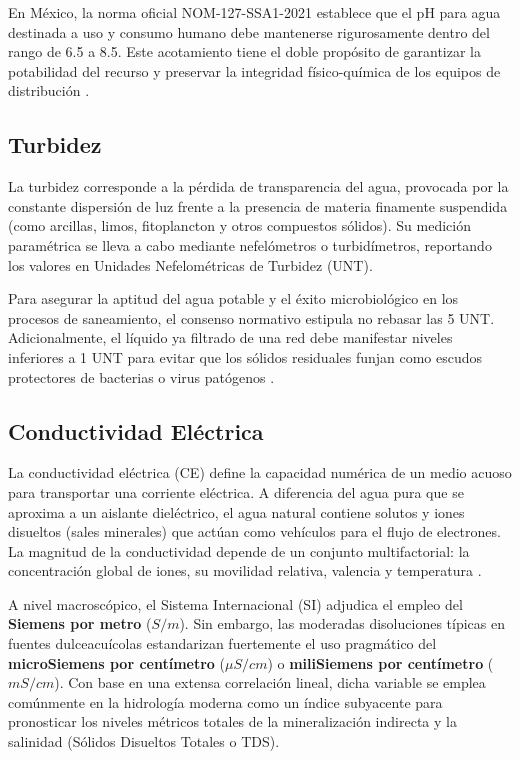 En México, la norma oficial NOM-127-SSA1-2021 establece que el pH para agua destinada a uso y consumo humano debe mantenerse rigurosamente dentro del rango de 6.5 a 8.5. Este acotamiento tiene el doble propósito de garantizar la potabilidad del recurso y preservar la integridad físico-química de los equipos de distribución \cite{uno2020}.

\subsection{Turbidez}
La turbidez corresponde a la pérdida de transparencia del agua, provocada por la constante dispersión de luz frente a la presencia de materia finamente suspendida (como arcillas, limos, fitoplancton y otros compuestos sólidos). Su medición paramétrica se lleva a cabo mediante nefelómetros o turbidímetros, reportando los valores en Unidades Nefelométricas de Turbidez (UNT).

Para asegurar la aptitud del agua potable y el éxito microbiológico en los procesos de saneamiento, el consenso normativo estipula no rebasar las 5 UNT. Adicionalmente, el líquido ya filtrado de una red debe manifestar niveles inferiores a 1 UNT para evitar que los sólidos residuales funjan como escudos protectores de bacterias o virus patógenos \cite{uno2020}.

\subsection{Conductividad Eléctrica}
La conductividad eléctrica (CE) define la capacidad numérica de un medio acuoso para transportar una corriente eléctrica. A diferencia del agua pura que se aproxima a un aislante dieléctrico, el agua natural contiene solutos y iones disueltos (sales minerales) que actúan como vehículos para el flujo de electrones. La magnitud de la conductividad depende de un conjunto multifactorial: la concentración global de iones, su movilidad relativa, valencia y temperatura \cite{nmx2000}.

A nivel macroscópico, el Sistema Internacional (SI) adjudica el empleo del \textbf{Siemens por metro} ($S/m$). Sin embargo, las moderadas disoluciones típicas en fuentes dulceacuícolas estandarizan fuertemente el uso pragmático del \textbf{microSiemens por centímetro} ($\mu S/cm$) o \textbf{miliSiemens por centímetro} ($mS/cm$). Con base en una extensa correlación lineal, dicha variable se emplea comúnmente en la hidrología moderna como un índice subyacente para pronosticar los niveles métricos totales de la mineralización indirecta y la salinidad (Sólidos Disueltos Totales o TDS).


